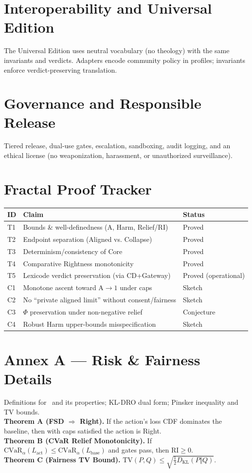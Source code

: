 \documentclass[11pt]{article}
\newcommand{\RI}{\mathrm{RI}}
\newcommand{\CVaR}{\mathrm{CVaR}}
\newcommand{\KL}{D_{\mathrm{KL}}}
\newcommand{\TV}{\mathrm{TV}}
\newcommand{\A}{\mathrm{A}}
\newcommand{\PhiSet}{\Phi}
\newcommand{\Baseline}{\mathrm{base}}
\theoremstyle{plain}
\theoremstyle{definition}
\begin{document}
\section{Interoperability and Universal Edition}
The Universal Edition uses neutral vocabulary (no theology) with the same invariants and verdicts. Adapters encode community policy in profiles; invariants enforce verdict-preserving translation.

\section{Governance and Responsible Release}
Tiered release, dual-use gates, escalation, sandboxing, audit logging, and an ethical license (no weaponization, harassment, or unauthorized surveillance).

\section{Fractal Proof Tracker}
\begin{center}
\begin{tabular}{@{}lll@{}}
\toprule
ID & Claim & Status \\ \midrule
T1 & Bounds \& well-definedness ($\A$, Harm, Relief/$\RI$) & Proved \\
T2 & Endpoint separation (Aligned vs. Collapse) & Proved \\
T3 & Determinism/consistency of Core & Proved \\
T4 & Comparative Rightness monotonicity & Proved \\
T5 & Lexicode verdict preservation (via CD+Gateway) & Proved (operational) \\
C1 & Monotone ascent toward $\A\to 1$ under caps & Sketch \\
C2 & No ``private aligned limit'' without consent/fairness & Sketch \\
C3 & $\PhiSet$ preservation under non-negative relief & Conjecture \\
C4 & Robust Harm upper-bounds misspecification & Sketch \\
\bottomrule
\end{tabular}
\end{center}

\appendix

\section{Annex A --- Risk \& Fairness Details}
Definitions for \CVaR\ and its properties; KL-DRO dual form; Pinsker inequality and TV bounds.\\
\textbf{Theorem A (FSD $\Rightarrow$ Right).} If the action's loss CDF dominates the baseline, then with caps satisfied the action is Right.\\
\textbf{Theorem B (CVaR Relief Monotonicity).} If $\CVaR_\alpha(L_{\text{act}})\le \CVaR_\alpha(L_{\Baseline})$ and gates pass, then $\RI\ge 0$.\\
\textbf{Theorem C (Fairness TV Bound).} $\TV(P,Q) \le \sqrt{\tfrac12 \KL(P\Vert Q)}$.
\end{document}
